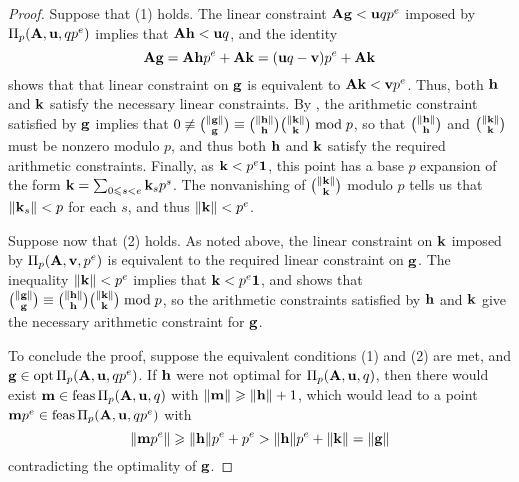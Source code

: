 \documentclass{article}
\begin{document}
\begin{proof}
   Suppose that (1) holds.
   The linear constraint $\mathbf{A}\mathbf{g} < \mathbf{u}qp^e$ imposed by $\Pi_p(\mathbf{A}, \mathbf{u}, qp^e)$ implies that $\mathbf{A}\mathbf{h} < \mathbf{u}q$, and the identity
   \[\mathbf{A} \mathbf{g} = \mathbf{A} \mathbf{h} p^e + \mathbf{A} \mathbf{k} = (\mathbf{u}q-\mathbf{v})p^e + \mathbf{A} \mathbf{k}\]
   shows that that linear constraint on $\mathbf{g}$ is equivalent to $\mathbf{A} \mathbf{k} < \mathbf{v}p^e$.
   Thus, both $\mathbf{h}$ and $\mathbf{k}$ satisfy the necessary linear constraints.
   By , the arithmetic constraint satisfied by $\mathbf{g}$ implies that $0 \not \equiv \binom{\| \mathbf{g} \|}{\mathbf{g}} \equiv \binom{\| \mathbf{h} \|}{\mathbf{h}} \binom{\| \mathbf{k} \|}{\mathbf{k}} \bmod p$, so that $\binom{\| \mathbf{h} \|}{\mathbf{h}}$ and $\binom{\| \mathbf{k} \|}{\mathbf{k}}$ must be nonzero modulo $p$, and thus both $\mathbf{h}$ and $\mathbf{k}$ satisfy the required arithmetic constraints.
   Finally, as $\mathbf{k} < p^e\mathbf{1}$, this point has a base $p$ expansion of the form $\mathbf{k} = \sum_{0 \leqslant s< e} \mathbf{k}_s  p^s$.
   The nonvanishing of $\binom{\| \mathbf{k} \|}{\mathbf{k}}$ modulo $p$ tells us that $\| \mathbf{k}_s \| < p$ for each $s$, and thus $\| \mathbf{k} \| < p^e$.
   
   Suppose now that (2) holds.
   As noted above, the linear constraint on $\mathbf{k}$ imposed by $\Pi_p(\mathbf{A},\mathbf{v},p^e)$ is equivalent to the required linear constraint on $\mathbf{g}$.
   The inequality $\| \mathbf{k} \| < p^e$ implies that $\mathbf{k} < p^e \mathbf{1}$, and  shows that $\binom{\| \mathbf{g} \|}{\mathbf{g}} \equiv  \binom{\| \mathbf{h} \|}{\mathbf{h}} \binom{\| \mathbf{k} \|}{\mathbf{k}} \bmod p$, so the arithmetic constraints satisfied by $\mathbf{h}$ and $\mathbf{k}$ give the necessary arithmetic constraint for $\mathbf{g}$.

   To conclude the proof, suppose the equivalent conditions (1) and (2) are met, and $\mathbf{g} \in \operatorname{opt} \Pi_p(\mathbf{A},\mathbf{u},qp^e)$.
   If $\mathbf{h}$ were not optimal for $\Pi_p(\mathbf{A}, \mathbf{u}, q)$, then there would exist $\mathbf{m} \in \operatorname{feas}\Pi_p(\mathbf{A}, \mathbf{u}, q)$ with $\| \mathbf{m} \| \geqslant \| \mathbf{h} \| + 1$, which would lead to a point $\mathbf{m}p^e \in \operatorname{feas}\Pi_p(\mathbf{A}, \mathbf{u}, qp^e)$ with
   \[ \| \mathbf{m}p^e \| \geqslant \| \mathbf{h} \|  p^e + p^e >  \| \mathbf{h} \|  p^e + \| \mathbf{k} \| = \| \mathbf{g} \|\]
   contradicting the optimality of $\mathbf{g}$.
\end{proof}
\end{document}
